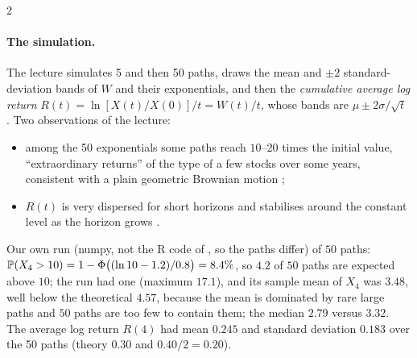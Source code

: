\begin{paracol}{2}
\paragraph{The simulation.}
The lecture simulates 5 and then 50 paths, draws the mean and $\pm2$ standard-deviation bands of $W$ and their exponentials, and then the \emph{cumulative average log return} $R(t)=\ln[X(t)/X(0)]/t=W(t)/t$, whose bands are $\mu\pm2\sigma/\sqrt t$
. Two observations of the lecture:
\begin{itemize}
  \item among the 50 exponentials some paths reach $10$--$20$ times the initial value, ``extraordinary
      returns'' of the type of a few stocks over some years, consistent with a plain geometric Brownian motion ;
  \item $R(t)$ is very dispersed for short horizons and stabilises around the
      constant level as the horizon grows .
\end{itemize}
Our own run (numpy, not the R code of , so the paths differ) of $50$ paths: $\mathbb{P}(X_4>10)=1-\Phi\bigl((\ln10-1.2)/0.8\bigr)=8.4\%$, so $4.2$ of $50$ paths are expected above $10$; the run had one (maximum $17.1$),
and its sample mean of $X_4$ was $3.48$, well below the theoretical $4.57$, because the mean is dominated by rare large paths and $50$ paths are too few to contain them; the median $2.79$ versus $3.32$. The average log return $R(4)$ had mean $0.245$ and standard deviation
$0.183$ over the 50 paths (theory $0.30$ and $0.40/2=0.20$).


\end{paracol}

